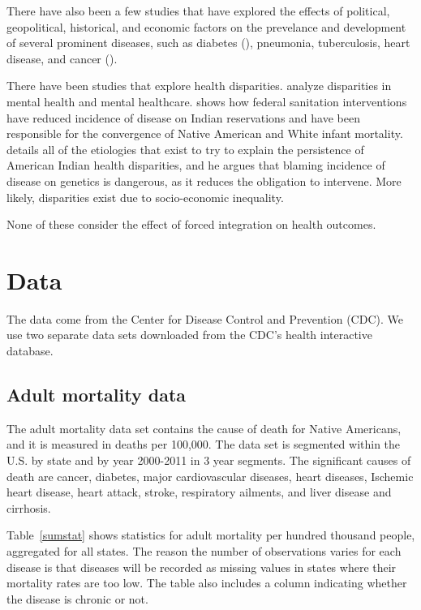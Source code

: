 \documentclass[12pt]{article}
\begin{document}
There have also been a few studies that have explored the effects of political, geopolitical, historical, and economic factors on the prevelance and development of several prominent diseases, such as diabetes (\cite{patchell2014role}), pneumonia, tuberculosis, heart disease, and cancer (\cite{heiner2014demographic}).

There have been studies that explore health disparities.
\cite{mcguire2008new} analyze disparities in mental health and mental healthcare.
\cite{watson2006public} shows how federal sanitation interventions have reduced incidence of disease on Indian reservations and have been responsible for the convergence of Native American and White infant mortality.
\cite{jones2006persistence} details all of the etiologies that exist to try to explain the persistence of American Indian health disparities, and he argues that blaming incidence of disease on genetics is dangerous, as it reduces the obligation to intervene. More likely, disparities exist due to socio-economic inequality.

None of these consider the effect of forced integration on health outcomes.

\section{Data}
The data come from the Center for Disease Control and Prevention (CDC). We use two separate data sets downloaded from the CDC's health interactive database.

\subsection{Adult mortality data}
The adult mortality data set contains the cause of death for Native Americans, and it is measured in deaths per 100,000.
The data set is segmented within the U.S. by state and by year 2000-2011 in 3 year segments.
The significant causes of death are cancer, diabetes, major cardiovascular diseases, heart diseases, Ischemic heart disease, heart attack, stroke, respiratory ailments, and liver disease and cirrhosis.

Table~\ref{sumstat} shows statistics for adult mortality per hundred thousand people, aggregated for all states.
The reason the number of observations varies for each disease is that diseases will be recorded as missing values in states where their mortality rates are too low.
The table also includes a column indicating whether the disease is chronic or not.
\end{document}
